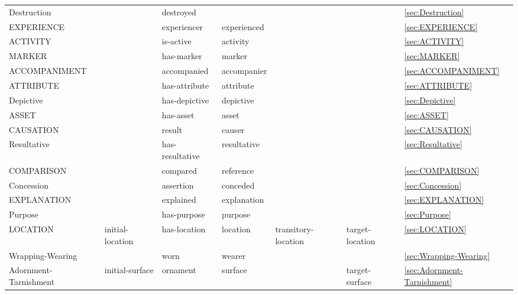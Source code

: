 \documentclass[a4paper]{article}
\newcommand{\fr}[1]{\textsf{#1}}
\newcommand{\rl}[1]{\textsf{#1}}
\begin{document}
\begin{table}
{\begin{tabular}{lllllll}
            \fr{Destruction} & & \rl{destroyed} & & & & \ref{sec:Destruction} \\
            \fr{EXPERIENCE} & & \rl{experiencer} & \rl{experienced} & & & \ref{sec:EXPERIENCE} \\
            \fr{ACTIVITY} & & \rl{is-active} & \rl{activity} & & & \ref{sec:ACTIVITY} \\
            \fr{MARKER} & & \rl{has-marker} & \rl{marker} & & & \ref{sec:MARKER} \\
            \midrule
            \fr{ACCOMPANIMENT} & & \rl{accompanied} & \rl{accompanier} & & & \ref{sec:ACCOMPANIMENT} \\
            \fr{ATTRIBUTE} & & \rl{has-attribute} & \rl{attribute} & & & \ref{sec:ATTRIBUTE} \\
            \fr{Depictive} & & \rl{has-depictive} & \rl{depictive} & & & \ref{sec:Depictive} \\
            \fr{ASSET} & & \rl{has-asset} & \rl{asset} & & & \ref{sec:ASSET} \\
            \fr{CAUSATION} & & \rl{result} & \rl{causer} & & & \ref{sec:CAUSATION} \\
            \fr{Resultative} & & \rl{has-resultative} & \rl{resultative} & & & \ref{sec:Resultative} \\
            \fr{COMPARISON} & & \rl{compared} & \rl{reference} & & & \ref{sec:COMPARISON} \\
            \fr{Concession} & & \rl{assertion} & \rl{conceded} & & & \ref{sec:Concession} \\
            \fr{EXPLANATION} & & \rl{explained} & \rl{explanation} & & & \ref{sec:EXPLANATION} \\
            \fr{Purpose} & & \rl{has-purpose} & \rl{purpose} & & & \ref{sec:Purpose} \\
            \fr{LOCATION} & \rl{initial-location} & \rl{has-location} & \rl{location} & \rl{transitory-location} & \rl{target-location} & \ref{sec:LOCATION} \\
            \fr{Wrapping-Wearing} & & \rl{worn} & \rl{wearer} & & & \ref{sec:Wrapping-Wearing} \\
            \fr{Adornment-Tarnishment} & \rl{initial-surface} & \rl{ornament} & \rl{surface} & & \rl{target-surface} & \ref{sec:Adornment-Tarnishment} \\

\end{tabular}}
\end{table}
\end{document}
